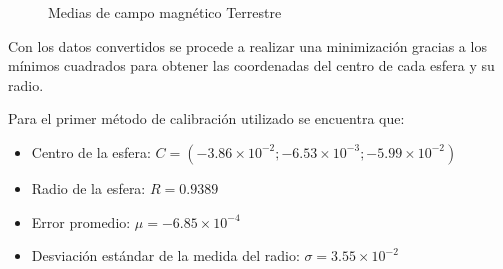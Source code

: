 \documentclass[main]{subfiles}
\begin{document}
\begin{figure}
  \begin{center}
  \end{center}
  \caption{Medias de campo magnético Terrestre}
\end{figure}


Con los datos convertidos se procede a realizar una minimización gracias a los mínimos cuadrados para obtener las coordenadas del centro de cada esfera y su radio.

Para el primer método de calibración utilizado se encuentra que:
\begin{itemize}
\item Centro de la esfera: $C=(-3.86\times10^{-2};-6.53\times10^{-3};-5.99\times10^{-2})$
\item Radio de la esfera: $R=0.9389$
\item Error promedio: $\mu = -6.85\times10^{-4}$
\item Desviación estándar de la medida del radio: $\sigma = 3.55\times10^{-2}$
\end{itemize}
\end{document}
